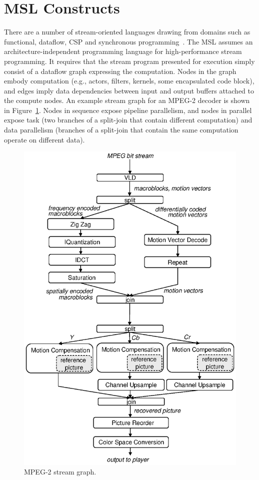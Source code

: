 \section{MSL Constructs}

There are a number of stream-oriented languages drawing from
domains such as functional, dataflow, CSP and synchronous
programming~\cite{survey97}. The MSL assumes an
architecture-independent programming language for high-performance
stream programming. It requires that the stream program presented for
execution simply consist of a dataflow graph expressing the
computation. Nodes in the graph embody computation (e.g., actors,
filters, kernels, some encapsulated code block), and edges imply data
dependencies between input and output buffers attached to the compute
nodes. An example stream graph for an MPEG-2 decoder is shown in
Figure~\ref{fig:mpeg}. Nodes in sequence expose pipeline parallelism,
and nodes in parallel expose task (two branches of a split-join that
contain different computation) and data parallelism (branches of a
split-join that contain the same computation operate on different data).

\begin{figure}[tb]
\begin{center}
\includegraphics[scale=.70]{figs/mpeg2d}
\end{center}
\caption[MPEG-2 stream graph.]{MPEG-2 stream graph.}
\label{fig:mpeg}
\end{figure}

